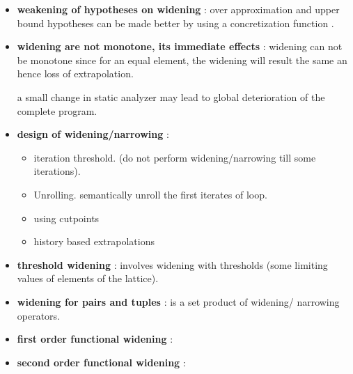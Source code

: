 \begin{itemize}
	\item{\textbf{weakening of hypotheses on widening} : over approximation and upper bound hypotheses can be made better by using a concretization function .
	}

	\item{\textbf{widening are not monotone, its immediate effects} : widening can not be monotone since for an equal element, the widening will result the same an hence loss of extrapolation.

	a small change in static analyzer may lead to global deterioration of the complete program.
	}

	\item{\textbf{design of widening/narrowing} :

	\begin{itemize}
		\item{iteration threshold. (do not perform widening/narrowing till some iterations).}
		\item{Unrolling. semantically unroll the first iterates of loop.}
		\item{using cutpoints}
		\item{history based extrapolations}
	\end{itemize}
	}

	\item{\textbf{threshold widening} : involves widening with thresholds (some limiting values of elements of the lattice).
	}

	\item{\textbf{widening for pairs and tuples} : is a set product of widening/ narrowing operators.
	}

	\item{\textbf{first order functional widening} : 
	}

	\item{\textbf{second order functional widening} :
	}

\end{itemize}